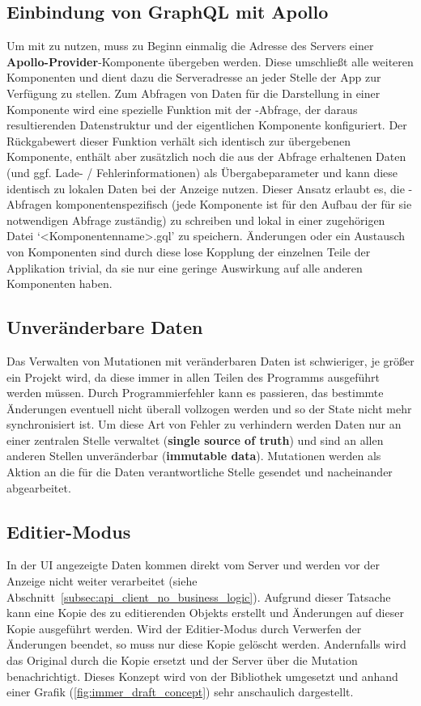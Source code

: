 \subsection{Einbindung von GraphQL mit Apollo}
Um  mit  zu nutzen, muss zu Beginn einmalig die Adresse des Servers einer \textbf{Apollo-Provider}-Komponente übergeben werden. Diese umschließt alle weiteren Komponenten und dient dazu die Serveradresse an jeder Stelle der App zur Verfügung zu stellen. Zum Abfragen von Daten für die Darstellung in einer Komponente wird eine spezielle Funktion mit der -Abfrage, der daraus resultierenden Datenstruktur und der eigentlichen Komponente konfiguriert. Der Rückgabewert dieser Funktion verhält sich identisch zur übergebenen Komponente, enthält aber zusätzlich noch die aus der Abfrage erhaltenen Daten (und ggf. Lade- / Fehlerinformationen) als Übergabeparameter und kann diese identisch zu lokalen Daten bei der Anzeige nutzen.
Dieser Ansatz erlaubt es, die -Abfragen komponentenspezifisch (jede Komponente ist für den Aufbau der für sie notwendigen Abfrage zuständig) zu schreiben und lokal in einer zugehörigen Datei `<Komponentenname>.gql' zu speichern. Änderungen oder ein Austausch von Komponenten sind durch diese lose Kopplung der einzelnen Teile der Applikation trivial, da sie nur eine geringe Auswirkung auf alle anderen Komponenten haben.

\subsection{Unveränderbare Daten}
Das Verwalten von Mutationen mit veränderbaren Daten ist schwieriger, je größer ein Projekt wird, da diese immer in allen Teilen des Programms ausgeführt werden müssen. Durch Programmierfehler kann es passieren, das bestimmte Änderungen eventuell nicht überall vollzogen werden und so der State nicht mehr synchronisiert ist. Um diese Art von Fehler zu verhindern werden Daten nur an einer zentralen Stelle verwaltet (\textbf{single source of truth}) und sind an allen anderen Stellen unveränderbar (\textbf{immutable data}). Mutationen werden als Aktion an die für die Daten verantwortliche Stelle gesendet und nacheinander abgearbeitet.

\subsection{Editier-Modus}
In der UI angezeigte Daten kommen direkt vom Server und werden vor der Anzeige nicht weiter verarbeitet (siehe Abschnitt~\ref{subsec:api_client_no_business_logic}). Aufgrund dieser Tatsache kann eine Kopie des zu editierenden Objekts erstellt und Änderungen auf dieser Kopie ausgeführt werden. Wird der Editier-Modus durch Verwerfen der Änderungen beendet, so muss nur diese Kopie gelöscht werden. Andernfalls wird das Original durch die Kopie ersetzt und der Server über die Mutation benachrichtigt. Dieses Konzept wird von der Bibliothek  \parencite{weststrate_2019} umgesetzt und anhand einer Grafik (\ref{fig:immer_draft_concept}) sehr anschaulich dargestellt.

